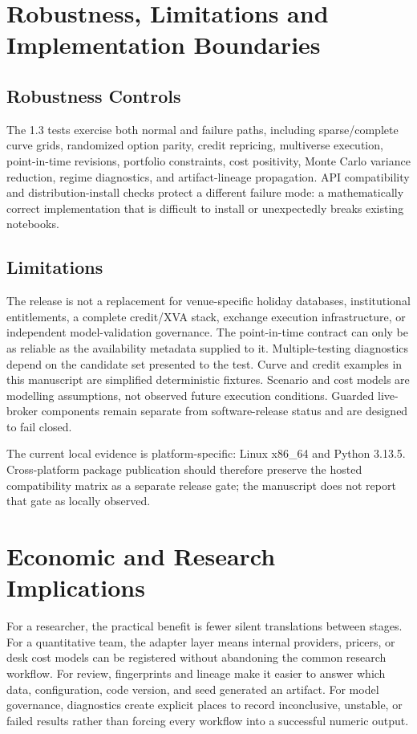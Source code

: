 \documentclass{asrpaper}
\begin{document}
\section{Robustness, Limitations and Implementation Boundaries}
\subsection{Robustness Controls}
The 1.3 tests exercise both normal and failure paths, including sparse/complete curve grids, randomized option parity, credit repricing, multiverse execution, point-in-time revisions, portfolio constraints, cost positivity, Monte Carlo variance reduction, regime diagnostics, and artifact-lineage propagation. API compatibility and distribution-install checks protect a different failure mode: a mathematically correct implementation that is difficult to install or unexpectedly breaks existing notebooks.

\subsection{Limitations}
The release is not a replacement for venue-specific holiday databases, institutional entitlements, a complete credit/XVA stack, exchange execution infrastructure, or independent model-validation governance. The point-in-time contract can only be as reliable as the availability metadata supplied to it. Multiple-testing diagnostics depend on the candidate set presented to the test. Curve and credit examples in this manuscript are simplified deterministic fixtures. Scenario and cost models are modelling assumptions, not observed future execution conditions. Guarded live-broker components remain separate from software-release status and are designed to fail closed.

The current local evidence is platform-specific: Linux x86\_64 and Python 3.13.5. Cross-platform package publication should therefore preserve the hosted compatibility matrix as a separate release gate; the manuscript does not report that gate as locally observed.

\section{Economic and Research Implications}
For a researcher, the practical benefit is fewer silent translations between stages. For a quantitative team, the adapter layer means internal providers, pricers, or desk cost models can be registered without abandoning the common research workflow. For review, fingerprints and lineage make it easier to answer which data, configuration, code version, and seed generated an artifact. For model governance, diagnostics create explicit places to record inconclusive, unstable, or failed results rather than forcing every workflow into a successful numeric output.
\end{document}
